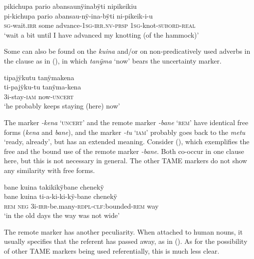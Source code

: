 \ea\label{ex:new23-prsp-2}
\begingl
\glpreamble pikichupa pario abansaunÿinabÿti nipikeikiu\\
\gla pi-kichupa pario abansau-nÿ-ina-bÿti ni-pikeik-i-u\\
\textsc{sg}-wait.\textsc{irr} some advance-1\textsc{sg}-\textsc{irr.nv}-\textsc{prsp} 1\textsc{sg}-knot-\textsc{subord}-\textsc{real}\\
\glft ‘wait a bit until I have advanced my knotting (of the hammock)’
\endgl
\trailingcitation{[rxx-e181022le]}
\xe
{}

Some can also be found on the  \textit{kuina} and/or on non-predica\-tively used adverbs in the clause as in (), in which \textit{tanÿma} ‘now’ bears the uncertainty marker.
 
\ea\label{ex:new23-uncert}
\begingl
\glpreamble tipajÿkutu tanÿmakena\\
\gla ti-pajÿku-tu tanÿma-kena\\
\glb 3i-stay-\textsc{iam} now-\textsc{uncert}\\
\glft ‘he probably keeps staying (here) now’
\endgl
\trailingcitation{[mqx-p110826l.092]}
\xe
  
The  marker \textit{-kena} ‘\textsc{uncert}’ and the remote marker \textit{-bane} ‘\textsc{rem}’ have identical free forms (\textit{kena} and \textit{bane}), and the  marker \textit{-tu} ‘\textsc{iam}’ probably goes back to the  \textit{metu} ‘ready, already’, but has an extended meaning. Consider (), which exemplifies the free and the bound use of the remote marker \textit{-bane}. Both co-occur in one clause here, but this is not necessary in general. The other TAME markers do not show any similarity with free forms.

\ea\label{ex:FirstTAME-1}
\begingl
\glpreamble bane kuina takikikÿbane chenekÿ\\
\gla bane kuina ti-a-ki-ki-kÿ-bane chenekÿ\\
\glb \textsc{rem} \textsc{neg} 3i-\textsc{irr}-be.many-\textsc{rdpl}-\textsc{clf:}bounded-\textsc{rem} way\\
\glft ‘in the old days the way was not wide’
\endgl
\trailingcitation{[rxx-p181101l-2.067]}
\xe

The remote marker has another peculiarity. When attached to human nouns, it usually specifies that the referent has passed away, as in (). As for the possibility of other TAME markers being used referentially, this is much less clear.%

